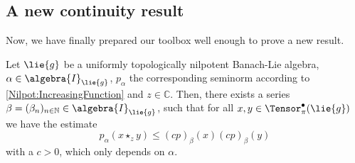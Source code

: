 \subsection{A new continuity result}

Now, we have finally prepared our toolbox well enough to prove a new result.
\begin{proposition}
	\label{Nilpot:Prop:TopNilBanachLie}
	Let $\lie{g}$ be a uniformly topologically nilpotent Banach-Lie algebra,
	$\alpha \in \algebra{I}_{\lie{g}}$, $p_{\alpha}$ the corresponding seminorm 
	according to \eqref{Nilpot:IncreasingFunction} and $z \in \mathbb{C}$. 
	Then, there exists a series $\beta = (\beta_n)_{n \in \mathbb{N}} \in 
	\algebra{I}_{\lie{g}}$, such that for all $x,y \in \Tensor_{\pi}^{\bullet}
	(\lie{g})$ we have the estimate
	\begin{equation}
		\label{Nilpot:TopNilBanachLie}
		p_{\alpha} \left(
			x \star_z y
		\right)
		\leq
		(c p)_{\beta} (x)
		(c p)_{\beta} (y)
	\end{equation}
	with a $c > 0$, which only depends on $\alpha$.
\end{proposition}
